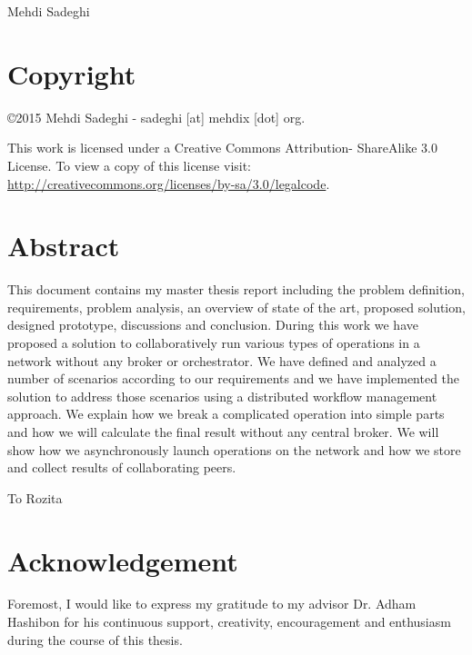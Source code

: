 \documentclass[12pt, a4paper, oneside]{report}
\newcounter{chapter_count}
\newenvironment{dedication}
  {\clearpage           %
   \thispagestyle{empty}%
   \vspace*{\stretch{1}}%
   \itshape             %
  }
  {\par %
   \vspace{\stretch{3}} %
   \clearpage           %
  }
\begin{document}
Mehdi Sadeghi

\thispagestyle{empty} 
\clearpage

\chapter*{Copyright}
\noindent
\begin{flushleft}
\copyright 2015 Mehdi Sadeghi - sadeghi [at] mehdix [dot] org.
 
This work is licensed under a Creative Commons Attribution- ShareAlike 3.0 License.
To view a copy of this license visit:
\url{http://creativecommons.org/licenses/by-sa/3.0/legalcode}.
\end{flushleft}

\thispagestyle{empty} 

\chapter*{Abstract}
This document contains my master thesis report including the problem definition, requirements, problem analysis,
an overview of state of the art, proposed solution, designed prototype, discussions and conclusion.
During this work we have proposed a solution to collaboratively run various types of operations in a network without any broker or orchestrator. 
We have defined and analyzed a number of scenarios according to our requirements 
and we have implemented the solution to address those scenarios using a distributed workflow management approach. We explain how
we break a complicated operation into simple parts and how we will calculate the final result without any central broker. We will show how
we asynchronously launch operations on the network and how we store and collect results of collaborating peers.

\thispagestyle{empty} 
\clearpage

\begin{dedication}
To Rozita
\end{dedication}


\chapter*{Acknowledgement}
Foremost, I would like to express my gratitude to my advisor Dr. Adham Hashibon for his continuous support, creativity,
encouragement and enthusiasm during the course of this thesis.
\end{document}
